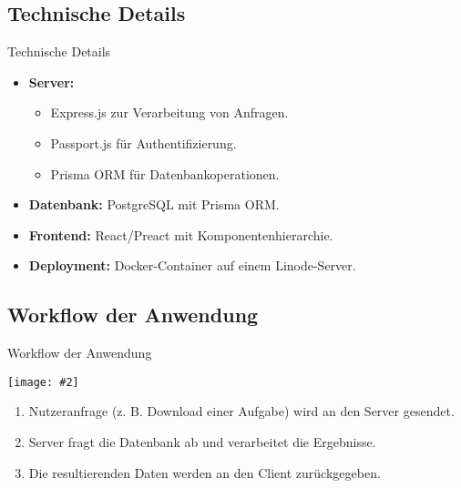 \documentclass{beamer}
\newcommand{\centfig}[2]{\begin{center}
  \texttt{[image: \#2]}
  \end{center}}
\begin{document}
\subsection{Technische Details}
\begin{frame}{Technische Details}
    \begin{itemize}
        \item \textbf{Server:}
        \begin{itemize}
            \item Express.js zur Verarbeitung von Anfragen.
            \item Passport.js für Authentifizierung.
            \item Prisma ORM für Datenbankoperationen.
        \end{itemize}
        \item \textbf{Datenbank:} PostgreSQL mit Prisma ORM.
        \item \textbf{Frontend:} React/Preact mit Komponentenhierarchie.
        \item \textbf{Deployment:} Docker-Container auf einem Linode-Server.
    \end{itemize}
\end{frame}

\subsection{Workflow der Anwendung}
\begin{frame}{Workflow der Anwendung}
    \centfig{0.6}{web-app-workflow.png}
    \begin{enumerate}
        \item Nutzeranfrage (z. B. Download einer Aufgabe) wird an den Server gesendet.
        \item Server fragt die Datenbank ab und verarbeitet die Ergebnisse.
        \item Die resultierenden Daten werden an den Client zurückgegeben.
    \end{enumerate}
\end{frame}

\end{document}
